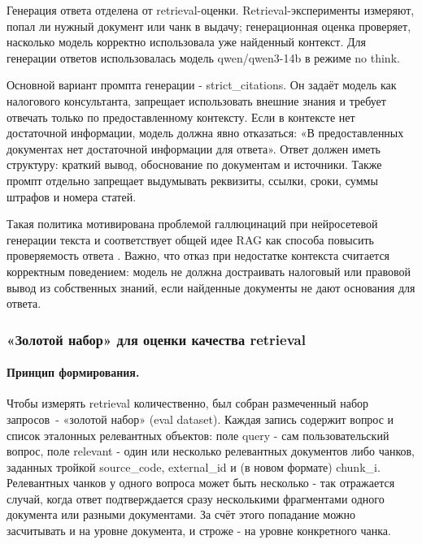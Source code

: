 \documentclass[a4paper,12pt]{article}
\begin{document}
Генерация ответа отделена от retrieval-оценки. Retrieval-эксперименты измеряют, попал ли нужный документ или чанк в выдачу; генерационная оценка проверяет, насколько модель корректно использовала уже найденный контекст. Для генерации ответов использовалась модель qwen/qwen3-14b в режиме no think.

Основной вариант промпта генерации - strict\_citations. Он задаёт модель как налогового консультанта, запрещает использовать внешние знания и требует отвечать только по предоставленному контексту. Если в контексте нет достаточной информации, модель должна явно отказаться: «В предоставленных документах нет достаточной информации для ответа». Ответ должен иметь структуру: краткий вывод, обоснование по документам и источники. Также промпт отдельно запрещает выдумывать реквизиты, ссылки, сроки, суммы штрафов и номера статей.

Такая политика мотивирована проблемой галлюцинаций при нейросетевой генерации текста \cite{ji2023hallucination} и соответствует общей идее RAG как способа повысить проверяемость ответа \cite{lewis2020rag}. Важно, что отказ при недостатке контекста считается корректным поведением: модель не должна достраивать налоговый или правовой вывод из собственных знаний, если найденные документы не дают основания для ответа.

\subsubsection{«Золотой набор» для оценки качества retrieval}

\paragraph{Принцип формирования.}

Чтобы измерять retrieval количественно, был собран размеченный набор запросов~- «золотой набор» (eval dataset). Каждая запись содержит вопрос и список эталонных релевантных объектов: поле query - сам пользовательский вопрос, поле relevant - один или несколько релевантных документов либо чанков, заданных тройкой source\_code, external\_id и (в новом формате) chunk\_i. Релевантных чанков у одного вопроса может быть несколько - так отражается случай, когда ответ подтверждается сразу несколькими фрагментами одного документа или разными документами. За счёт этого попадание можно засчитывать и на уровне документа, и строже - на уровне конкретного чанка.
\end{document}
